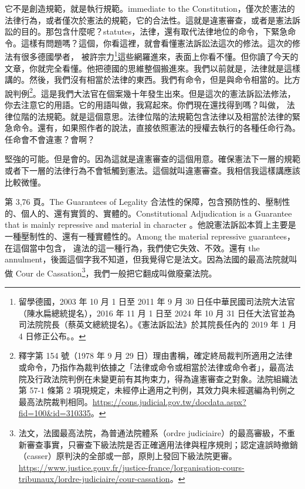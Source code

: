 \hypertarget{w05:cue:135}{}它不是創造規範，就是執行規範。immediate to the Constitution，僅次於憲法的法律行為，或者僅次於憲法的規範，它的合法性。這就是違憲審查，或者是憲法訴訟的目的。那包含什麼呢？statutes，法律，還有取代法律地位的命令，下緊急命令。這樣有問題嗎？這個，你看這裡，就會看懂憲法訴訟法這次的修法。這次的修法有很多德國學者，
\hypertarget{w05:cue:136}{}被許宗力\footnote{留學德國，2003 年 10 月 1 日至 2011 年 9 月 30 日任中華民國司法院大法官（陳水扁總統提名），2016 年 11 月 1 日至 2024 年 10 月 31 日任大法官並為司法院院長（蔡英文總統提名）。《憲法訴訟法》於其院長任內的 2019 年 1 月 4 日修正公布。\cite{dfgslaw1993}。}這些網羅進來，表面上你看不懂。但你讀了今天的文章，你就完全看懂。他把德國的思維整個搬進來。我們以前就是，法律就是這樣講的。然後，我們沒有相當於法律的東西。我們有命令，但是與命令相當的。比方說判例\footnote{釋字第 154 號（1978 年 9 月 29 日）理由書稱，確定終局裁判所適用之法律或命令，乃指作為裁判依據之「法律或命令或相當於法律或命令者」，最高法院及行政法院判例在未變更前有其拘束力，得為違憲審查之對象。法院組織法第 57-1 條第 2 項現規定，未經停止適用之判例，其效力與未經選編為判例之最高法院裁判相同。\url{https://cons.judicial.gov.tw/docdata.aspx?fid=100&id=310335}。}。這是我們大法官在個案幾十年發生出來。但是這次的憲法訴訟法修法，你去注意它的用語。它的用語叫做，我寫起來。你們現在還找得到嗎？叫做，
\hypertarget{w05:cue:137}{}法律位階的法規範。就是這個意思。法律位階的法規範包含法律以及相當於法律的緊急命令。還有，如果照作者的說法，直接依照憲法的授權去執行的各種任命行為。任命會不會違憲？會啊？

\hypertarget{w05:cue:138}{}堅強的可能。但是會的。因為這就是違憲審查的這個用意。確保憲法下一層的規範或者下一層的法律行為不會牴觸到憲法。這個就叫違憲審查。我相信我這樣講應該比較微懂。

\hypertarget{w05:cue:139}{}第 3,76 頁。The Guarantees of Legality 合法性的保障，包含預防性的、壓制性的、個人的、還有實質的、實體的。Constitutional Adjudication is a Guarantee that is mainly repressive and material in character 。他說憲法訴訟本質上主要是一種壓制性的、還有一種實體性的。Among the material repressive guarantees，在這個當中包含，
\hypertarget{w05:cue:140}{}違法的這一種行為，我們使它失效、不效。還有 the annulment，後面這個字我不知道，但我覺得它是法文。因為法國的最高法院就叫做 Cour de Cassation\footnote{法文，法國最高法院，為普通法院體系（ordre judiciaire）的最高審級，不重新審查事實，只審查下級法院是否正確適用法律與程序規則；認定違誤時撤銷（casser）原判決的全部或一部，原則上發回下級法院更審。\url{https://www.justice.gouv.fr/justice-france/lorganisation-cours-tribunaux/lordre-judiciaire/cour-cassation}。}，我們一般把它翻成叫做廢棄法院。

